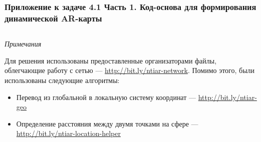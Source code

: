 \subsubsection*{Приложение к задаче 4.1 Часть 1. Код-основа для формирования динамической AR-карты}

\inputminted[fontsize=\footnotesize, linenos]{csharp}{final/command_tour/ar/task_04/source.cs}

\textit{Примечания}

Для решения использованы предоставленные организаторами файлы, облегчающие работу с сетью — \url{http://bit.ly/ntiar-network}. Помимо этого, были использованы следующие алгоритмы:
\begin{itemize}
    \item Перевод из глобальной в локальную систему координат — \url{http://bit.ly/ntiar-geo}
    \item Определение расстояния между двумя точками на сфере — \url{http://bit.ly/ntiar-location-helper}
\end{itemize}